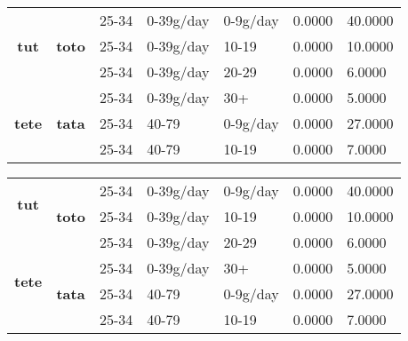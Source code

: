 \documentclass{article}
\begin{document}
\begin{table}
\begin{tabular}{c|c|lllll|}
\hline
\multirow{3}{*}{\textbf{tut}}  & \multirow{3}{*}{\textbf{toto}}  &  25-34 & 0-39g/day & 0-9g/day & 0.0000 & 40.0000  \\
 &  &  25-34 & 0-39g/day & 10-19    & 0.0000 & 10.0000  \\
 &  &  25-34 & 0-39g/day & 20-29    & 0.0000 & 6.0000   \\\cline{1-1}\cline{2-2}
\multirow{3}{*}{\textbf{tete}}  & \multirow{3}{*}{\textbf{tata}}  &  25-34 & 0-39g/day & 30+      & 0.0000 & 5.0000   \\
 &  &  25-34 & 40-79     & 0-9g/day & 0.0000 & 27.0000  \\
 &  &  25-34 & 40-79     & 10-19    & 0.0000 & 7.0000   \\
\hline
\end{tabular}
\end{table}

\begin{table}
\begin{tabular}{cclllll|}
\hline
\multirow{2}{*}{\textbf{tut}}  & \multirow{3}{*}{\textbf{toto}}  &  25-34 & 0-39g/day & 0-9g/day & 0.0000 & 40.0000  \\
 &  &  25-34 & 0-39g/day & 10-19    & 0.0000 & 10.0000  \\\cline{2-2}
\multirow{4}{*}{\textbf{tete}}  &  &  25-34 & 0-39g/day & 20-29    & 0.0000 & 6.0000   \\\cline{1-1}
 & \multirow{3}{*}{\textbf{tata}}  &  25-34 & 0-39g/day & 30+      & 0.0000 & 5.0000   \\
 &  &  25-34 & 40-79     & 0-9g/day & 0.0000 & 27.0000  \\
 &  &  25-34 & 40-79     & 10-19    & 0.0000 & 7.0000   \\
\hline
\end{tabular}
\end{table}
\end{document}

